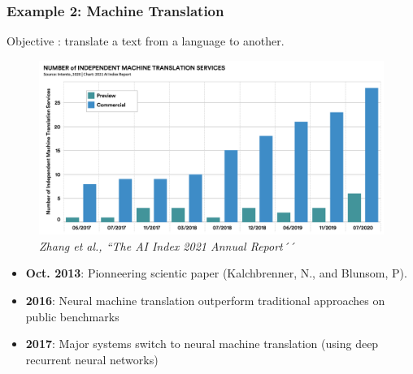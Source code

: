 \documentclass[handout]{beamer}
\newcommand{\rref}[1][]{\hfill{\scriptsize\textit{#1}}}
\begin{document}
\begin{frame}
\frametitle{Example 2: Machine Translation}
Objective : translate a text from a language to another.
\begin{figure}
\includegraphics[width=.5\textwidth]{fig/L1/progress-machine-translation.png}\\
  \rref[Zhang et al., ``The AI Index 2021 Annual Report´´]

\end{figure}

\begin{itemize}
\item {\bf Oct. 2013}: Pionneering scientic paper  (Kalchbrenner, N., and Blunsom, P).
\item {\bf 2016}: Neural machine translation outperform traditional approaches on public benchmarks
\item {\bf 2017}: Major systems  switch to
  neural machine translation  (using deep recurrent neural networks)
\end{itemize}
\end{frame}
\end{document}
